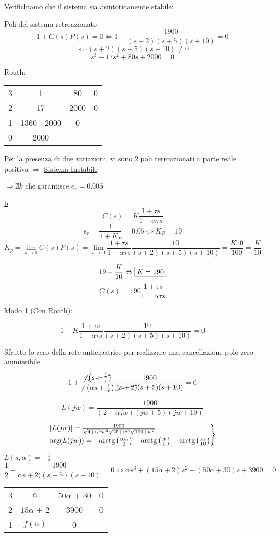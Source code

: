 \documentclass{article}
\begin{document}
Verifichiamo che il sistema sia asintoticamente stabile:

Poli del sistema retroazionato
\[ 1 + C(s)P(s) = 0 \Leftrightarrow 1 + \frac{1900}{(s+2)(s+5)(s+10)} = 0\]
\[ \Leftrightarrow (s+2)(s+5)(s+10) \neq 0\]
\[ s^3 + 17s^2 + 80 s + 2000 = 0\]

Routh:

\begin{tabular}{c|c c c}
        3 & 1 & 80 & 0\\
        2 & 17 & 2000 & 0\\
        1 & 1360 - 2000 & 0\\
        0 & 2000
\end{tabular}

Per la presenza di due variazioni, vi sono 2 poli retroazionati a parte reale positiva $\Rightarrow$ \underline{Sistema Instabile}

$\Rightarrow \nexists k$  che garantisce $e_r = 0.005$


\underline{b}
\[ C(s) = K\frac{1 + \tau s}{1 + \alpha \tau s} \]
\[ e_r = \frac{1}{1 + K_P} = 0.05 \Leftrightarrow K_P = 19\]
\[ K_p = \lim_{s \to 0} C(s)P(s) = \lim_{s \to 0} \frac{1 + \tau s}{1 + \alpha \tau s} \frac{10}{(s+2)(s+5)(s+10)} = \frac{K 10}{100} = \frac{K}{10} \]

\[ 19 - \frac{K}{10} \Leftrightarrow \framebox{$ K = 190 $} \]
\[ C(s) = 190 \frac{1 + \tau s}{1 = \alpha \tau s} \]

Modo 1 (Con Routh):


\[ 1 + K \frac{1 + \tau s }{1 + \alpha \tau s }\frac {10}{(s+2)(s+5) (s+10)} =  0\]

Sfrutto lo zero della rete anticipatrice per realizzare una cancellazione polo-zero ammissibile

\[ 1+ \frac{\cancel{\tau}\cancel{\left( s + \frac{1}{\tau}\right)}}{\cancel{\tau} \left( \alpha s + \frac{1}{\tau}\right)}\frac{1900}{\cancel{(s+2)}(s+5)(s+10)} = 0 \]

\[ L(jw) = \frac{1900}{(2 + \alpha jw) (jw + 5)(jw + 10)} \]

\[
    \begin{rcases}
     |L(jw)| = \frac{1900}{\sqrt{4 + \alpha^2 w^2} \sqrt{25 + w^5} \sqrt{100 + w^2}}\\
     \text{arg}(L(jw)) = -\text{arctg}\left(\frac{\alpha w}{2}\right) - \text{arctg}\left( \frac{w}{5} \right) - \text{arctg}\left(\frac{w}{10}\right)
    \end{rcases}
\]

$ L(s, \alpha) = -\frac{1}{2} $ 
\[ \frac{1}{2} + \frac{1900}{\alpha s + 2)(s + 5) (s+10)} = 0 \Leftrightarrow \alpha s^3 + (15 \alpha + 2)s^2 + (50 \alpha + 30) s + 3900 = 0 \]
\begin{minipage}{0.5\taxtwidth}
\begin{tabular}{c| c c c}
    3 & $\alpha$ & $50\alpha$ + 30 & 0\\
    2 & $15\alpha$ + 2 & 3900 & 0\\
    1 & $f(\alpha)$ & 0
\end{tabular}
\end{minipage}
\end{document}
